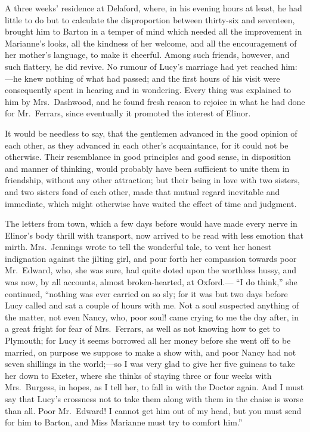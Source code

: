 \documentclass{article}
\begin{document}
A three weeks' residence at Delaford, where,
in his evening hours at least, he had little to do
but to calculate the disproportion between thirty-six
and seventeen, brought him to Barton in a temper of mind
which needed all the improvement in Marianne's looks,
all the kindness of her welcome, and all the encouragement
of her mother's language, to make it cheerful.
Among such friends, however, and such flattery, he did revive.
No rumour of Lucy's marriage had yet reached him:---he knew
nothing of what had passed; and the first hours of his
visit were consequently spent in hearing and in wondering.
Every thing was explained to him by Mrs.\ Dashwood,
and he found fresh reason to rejoice in what he had done
for Mr.\ Ferrars, since eventually it promoted the interest
of Elinor.

It would be needless to say, that the gentlemen advanced
in the good opinion of each other, as they advanced in each
other's acquaintance, for it could not be otherwise.
Their resemblance in good principles and good sense,
in disposition and manner of thinking, would probably
have been sufficient to unite them in friendship,
without any other attraction; but their being in love
with two sisters, and two sisters fond of each other,
made that mutual regard inevitable and immediate,
which might otherwise have waited the effect of time
and judgment.

The letters from town, which a few days before would
have made every nerve in Elinor's body thrill with transport,
now arrived to be read with less emotion that mirth.
Mrs.\ Jennings wrote to tell the wonderful tale, to vent her
honest indignation against the jilting girl, and pour forth
her compassion towards poor Mr.\ Edward, who, she was sure,
had quite doted upon the worthless hussy, and was now,
by all accounts, almost broken-hearted, at Oxford.---%
``I do think,'' she continued, ``nothing was ever carried
on so sly; for it was but two days before Lucy called
and sat a couple of hours with me.  Not a soul suspected
anything of the matter, not even Nancy, who, poor soul!
came crying to me the day after, in a great fright
for fear of Mrs.\ Ferrars, as well as not knowing how to
get to Plymouth; for Lucy it seems borrowed all her
money before she went off to be married, on purpose
we suppose to make a show with, and poor Nancy had not
seven shillings in the world;---so I was very glad to give
her five guineas to take her down to Exeter, where she
thinks of staying three or four weeks with Mrs.\ Burgess,
in hopes, as I tell her, to fall in with the Doctor again.
And I must say that Lucy's crossness not to take them
along with them in the chaise is worse than all.
Poor Mr.\ Edward! I cannot get him out of my head, but you
must send for him to Barton, and Miss Marianne must try to
comfort him.''
\end{document}
